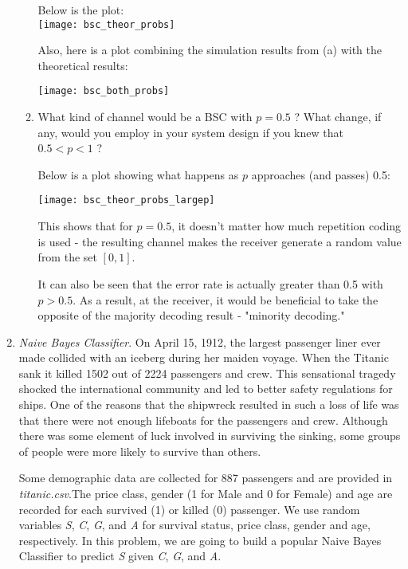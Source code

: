 \documentclass[]{article}
\begin{document}
\begin{enumerate}
\begin{enumerate}
		Below is the plot:\\
		\texttt{[image: bsc\_theor\_probs]}
		
		Also, here is a plot combining the simulation results from (a) with the theoretical results:
		
		\texttt{[image: bsc\_both\_probs]}
		
		
		
		\item What kind of channel would be a BSC with $ p = 0.5 $ ?  What change, if any, would you employ in your system design if you knew that $ 0.5 < p < 1 $ ?
		
		Below is a plot showing what happens as $p$ approaches (and passes) 0.5:
		
		\texttt{[image: bsc\_theor\_probs\_largep]}
		
		This shows that for $p=0.5$, it doesn't matter how much repetition coding is used - the resulting channel makes the receiver generate a random value from the set $[0, 1]$.
		
		It can also be seen that the error rate is actually greater than 0.5 with $p > 0.5$. As a result, at the receiver, it would be beneficial to take the opposite of the majority decoding result - "minority decoding."
		
		
	\end{enumerate}


\pagebreak

    \item \textit{Naive  Bayes  Classifier}. On April 15, 1912,  the largest passenger liner ever made  collided  with  an  iceberg  during  her  maiden  voyage.   When  the  Titanic  sank it  killed  1502  out  of  2224  passengers  and  crew.   This  sensational  tragedy  shocked the  international  community  and  led  to  better  safety  regulations  for  ships.   One  of the reasons that the shipwreck resulted in such a loss of life was that there were not enough lifeboats for the passengers and crew.  Although there was some element of luck involved in surviving the sinking, some groups of people were more likely to survive than others. 
    
    Some demographic data are collected for 887 passengers and are provided in \textit{titanic.csv}.The price class, gender (1 for Male and 0 for Female) and age are recorded for each survived (1) or killed (0) passenger.  We use random variables \textit{S}, \textit{C}, \textit{G}, and \textit{A} for survival status, price class, gender and age, respectively.  In this problem, we are going to build a popular Naive Bayes Classifier to predict \textit{S} given \textit{C}, \textit{G}, and \textit{A}.
    

\end{enumerate}
\end{document}
